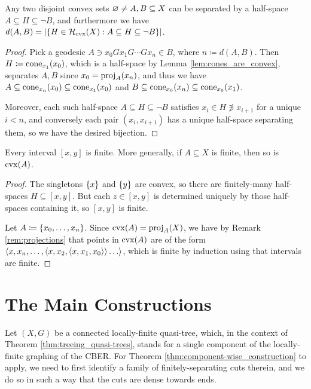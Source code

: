 \documentclass[reqno]{amsart}
\begin{document}
    \begin{lemma}\label{lem:half_space_separating_convex}
        Any two disjoint convex sets $\em\neq A,B\subseteq X$ can be separated by a half-space $A\subseteq H\subseteq\lnot B$, and furthermore we have $d(A,B)=|\!\l\{H\in\mc{H}_\mathrm{cvx}(X)\st A\subseteq H\subseteq\lnot B\r\}\!|$.
    \end{lemma}
    \begin{proof}
        Pick a geodesic $A\ni x_0Gx_1G\cdots Gx_n\in B$, where $n\coloneqq d(A,B)$. Then $H\coloneqq\cone_{x_1}(x_0)$, which is a half-space by Lemma \ref{lem:cones_are_convex}, separates $A,B$ since $x_0=\proj_A(x_n)$, and thus we have $A\subseteq\cone_{x_n}(x_0)\subseteq\cone_{x_1}(x_0)$ and $B\subseteq\cone_{x_0}(x_n)\subseteq\cone_{x_0}(x_1)$.

        Moreover, each such half-space $A\subseteq H\subseteq\lnot B$ satisfies $x_i\in H\not\ni x_{i+1}$ for a unique $i<n$, and conversely each pair $(x_i,x_{i+1})$ has a unique half-space separating them, so we have the desired bijection.
    \end{proof}

    \begin{lemma}\label{lem:convex_of_finite_is_finite}
        Every interval $[x,y]$ is finite. More generally, if $A\subseteq X$ is finite, then so is $\cvx(A)$.
    \end{lemma}
    \begin{proof}
        The singletons $\l\{x\r\}$ and $\l\{y\r\}$ are convex, so there are finitely-many half-spaces $H\subseteq[x,y]$. But each $z\in[x,y]$ is determined uniquely by those half-spaces containing it, so $[x,y]$ is finite.

        Let $A\coloneqq\l\{x_0,\dots,x_n\r\}$. Since $\cvx(A)=\proj_A(X)$, we have by Remark \ref{rem:projections} that points in $\cvx(A)$ are of the form $\l\langle x,x_n,\dots,\l\langle x,x_2,\l\langle x,x_1,x_0\r\rangle\r\rangle\dots\r\rangle$, which is finite by induction using that intervals are finite.
    \end{proof}

    \section{The Main Constructions}

    Let $(X,G)$ be a connected locally-finite quasi-tree, which, in the context of Theorem \ref{thm:treeing_quasi-trees}, stands for a single component of the locally-finite graphing of the CBER. For Theorem \ref{thm:component-wise_construction} to apply, we need to first identify a family of finitely-separating cuts therein, and we do so in such a way that the cuts are dense towards ends.
\end{document}
